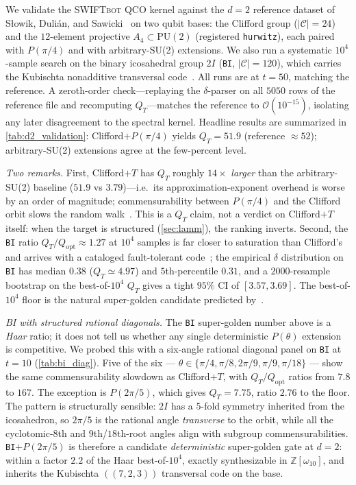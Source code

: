 \documentclass[twocolumn,superscriptaddress,showpacs,nofootinbib,notitlepage,preprintnumbers,secnumarabic,amssymb, nobibnotes, aps, prd]{revtex4-2}
\newcommand{\QT}{Q_{T}}              %
\newcommand{\Popt}{Q_{\mathrm{opt}}} %
\newcommand{\SWIFTbot}{\textsc{SWIFTbot}\xspace}
\begin{document}
We validate the \SWIFTbot QCO kernel against the $d=2$ reference dataset of S{\l}owik, Duli{\'a}n, and Sawicki~\cite{Slowik:2025qco} on two qubit bases: the Clifford group ($|\mathcal{C}|=24$) and the $12$-element projective $A_4\subset\mathrm{PU}(2)$ (registered \texttt{hurwitz}), each paired with $P(\pi/4)$ and with arbitrary-SU(2) extensions. We also run a systematic $10^4$-sample search on the binary icosahedral group $2I$ (\texttt{BI}, $|\mathcal{C}|=120$), which carries the Kubischta nonadditive transversal code~\cite{Kubischta:2I}. All runs are at $t=50$, matching the reference. A zeroth-order check---replaying the $\delta$-parser on all $5050$ rows of the reference file and recomputing $\QT$---matches the reference to $\mathcal{O}(10^{-15})$, isolating any later disagreement to the spectral kernel. Headline results are summarized in \cref{tab:d2_validation}: Clifford$+P(\pi/4)$ yields $\QT=51.9$ (reference $\approx 52$); arbitrary-SU(2) extensions agree at the few-percent level.

\emph{Two remarks.} First, Clifford$+T$ has $\QT$ roughly $14\times$ \emph{larger} than the arbitrary-SU(2) baseline ($51.9$ vs $3.79$)---i.e.\ its approximation-exponent overhead is worse by an order of magnitude; commensurability between $P(\pi/4)$ and the Clifford orbit slows the random walk~\cite{Slowik:2025qco}. This is a $\QT$ claim, not a verdict on Clifford$+T$ itself: when the target is structured (\cref{sec:lamm}), the ranking inverts. Second, the \texttt{BI} ratio $\QT/\Popt \approx 1.27$ at $10^4$ samples is far closer to saturation than Clifford's and arrives with a cataloged fault-tolerant code~\cite{Kubischta:2I}; the empirical $\delta$ distribution on \texttt{BI} has median $0.38$ ($\QT\simeq 4.97$) and $5$th-percentile $0.31$, and a $2000$-resample bootstrap on the best-of-$10^4$ $\QT$ gives a tight $95\%$ CI of $[3.57, 3.69]$. The best-of-$10^4$ floor is the natural super-golden candidate predicted by~\cite{Sarnak:2015}.

\emph{BI with structured rational diagonals.} The \texttt{BI} super-golden number above is a \emph{Haar} ratio; it does not tell us whether any single deterministic $P(\theta)$ extension is competitive. We probed this with a six-angle rational diagonal panel on \texttt{BI} at $t=10$ (\cref{tab:bi_diag}). Five of the six --- $\theta\in\{\pi/4,\pi/8,2\pi/9,\pi/9,\pi/18\}$ --- show the same commensurability slowdown as Clifford$+T$, with $\QT/\Popt$ ratios from $7.8$ to $167$. The exception is $P(2\pi/5)$, which gives $\QT = 7.75$, ratio $2.76$ to the floor. The pattern is structurally sensible: $2I$ has a $5$-fold symmetry inherited from the icosahedron, so $2\pi/5$ is the rational angle \emph{transverse} to the orbit, while all the cyclotomic-$8$th and $9$th/$18$th-root angles align with subgroup commensurabilities. \texttt{BI}$+P(2\pi/5)$ is therefore a candidate \emph{deterministic} super-golden gate at $d=2$: within a factor $2.2$ of the Haar best-of-$10^4$, exactly synthesizable in $\mathbb{Z}[\omega_{10}]$, and inherits the Kubischta $((7,2,3))$ transversal code on the base.
\end{document}
